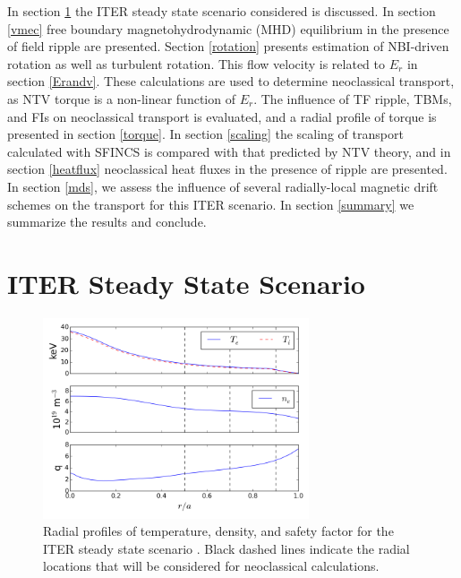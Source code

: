 \documentclass{article}
\begin{document}
In section \ref{steadystate} the ITER steady state scenario considered is discussed. In section \ref{vmec} free boundary magnetohydrodynamic (MHD) equilibrium in the presence of field ripple are presented. Section \ref{rotation} presents estimation of NBI-driven rotation as well as turbulent rotation. This flow velocity is related to $E_r$ in section \ref{Erandv}. These calculations are used to determine neoclassical transport, as NTV torque is a non-linear function of $E_r$. The influence of TF ripple, TBMs, and FIs on neoclassical transport is evaluated, and a radial profile of torque is presented in section \ref{torque}. In section \ref{scaling} the scaling of transport calculated with SFINCS is compared with that predicted by NTV theory, and in section \ref{heatflux} neoclassical heat fluxes in the presence of ripple are presented. In section \ref{mds}, we assess the influence of several radially-local magnetic drift schemes on the transport for this ITER scenario. In section \ref{summary} we summarize the results and conclude.

\section{ITER Steady State Scenario}\label{steadystate}

\FloatBarrier

\begin{figure}[h!]
\centering
\includegraphics[width=0.7\textwidth]{profiles.png}
\caption{\label{fig:profiles} Radial profiles of temperature, density, and safety factor for the ITER steady state scenario \cite{Poli2014}. Black dashed lines indicate the radial locations that will be considered for neoclassical calculations.}
\end{figure}
\end{document}
